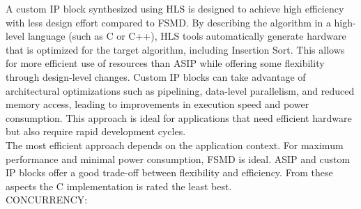 \documentclass[conference]{IEEEtran}
\begin{document}
A custom IP block synthesized using HLS is designed to achieve high efficiency with less design effort compared to FSMD. By describing the algorithm in a high-level language (such as C or C++), HLS tools automatically generate hardware that is optimized for the target algorithm, including Insertion Sort. This allows for more efficient use of resources than ASIP while offering some flexibility through design-level changes. Custom IP blocks can take advantage of architectural optimizations such as pipelining, data-level parallelism, and reduced memory access, leading to improvements in execution speed and power consumption. This approach is ideal for applications that need efficient hardware but also require rapid development cycles.\\
The most efficient approach depends on the application context. For maximum performance and minimal power consumption, FSMD is ideal. ASIP and custom IP blocks offer a good trade-off between flexibility and efficiency. From these aspects the C implementation is rated the least best.
\\
CONCURRENCY:
\end{document}
